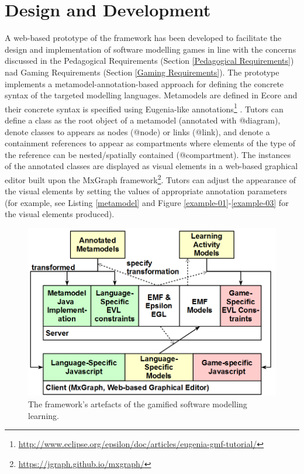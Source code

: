 \documentclass[12pt, a4paper]{report} \usepackage[titletoc]{appendix}
\begin{document}
\section{Design and Development}
A web-based prototype of the framework has been developed to facilitate the design and implementation of software modelling games in line with the concerns discussed in the Pedagogical Requirements (Section \ref{Pedagogical Requirements}) nad Gaming Requirements (Section \ref{Gaming Requirements}). The prototype implements a metamodel-annotation-based approach for defining the concrete syntax of the targeted modelling languages. Metamodels are defined in Ecore \cite{steinberg2008emf} and their concrete syntax is specified using Eugenia-like annotations\footnote{\url{http://www.eclipse.org/epsilon/doc/articles/eugenia-gmf-tutorial/}} \cite{kolovos2015eugenia}. Tutors can define a class as the root object of a metamodel (annotated with {\selectfont @diagram}), denote classes to appears as nodes ({\selectfont @node}) or links ({\selectfont @link}), and denote a containment references to appear as compartments where elements of the type of the reference can be nested/spatially contained ({\selectfont @compartment}). The instances of the annotated classes are displayed as visual elements in a web-based graphical editor built upon the MxGraph framework\footnote{\url{https://jgraph.github.io/mxgraph/}}. Tutors can adjust the appearance of the visual elements by setting the values of appropriate annotation parameters (for example, see Listing \ref{metamodel} and Figure \ref{example-01}-\ref{example-03} for the visual elements produced).

\begin{figure}[t!]
\centering
\includegraphics[width=12cm]{artefacts}
\caption{The framework's artefacts of the gamified software modelling learning.}
\label{artefacts}
\end{figure}
\end{document}
